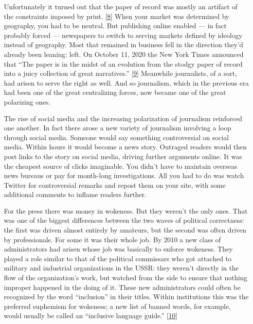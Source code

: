 Unfortunately it turned out that the paper of record was mostly an
artifact of the constraints imposed by print. {[}\hyperref[f8n]{8}{]}
When your market was determined by geography, you had to be neutral. But
publishing online enabled --- in fact probably forced --- newspapers to
switch to serving markets defined by ideology instead of geography. Most
that remained in business fell in the direction they'd already been
leaning: left. On October 11, 2020 the New York Times announced that
``The paper is in the midst of an evolution from the stodgy paper of
record into a juicy collection of great narratives.''
{[}\hyperref[f9n]{9}{]} Meanwhile journalists, of a sort, had arisen to
serve the right as well. And so journalism, which in the previous era
had been one of the great centralizing forces, now became one of the
great polarizing ones.

The rise of social media and the increasing polarization of journalism
reinforced one another. In fact there arose a new variety of journalism
involving a loop through social media. Someone would say something
controversial on social media. Within hours it would become a news
story. Outraged readers would then post links to the story on social
media, driving further arguments online. It was the cheapest source of
clicks imaginable. You didn't have to maintain overseas news bureaus or
pay for month-long investigations. All you had to do was watch Twitter
for controversial remarks and repost them on your site, with some
additional comments to inflame readers further.

For the press there was money in wokeness. But they weren't the only
ones. That was one of the biggest differences between the two waves of
political correctness: the first was driven almost entirely by amateurs,
but the second was often driven by professionals. For some it was their
whole job. By 2010 a new class of administrators had arisen whose job
was basically to enforce wokeness. They played a role similar to that of
the political commissars who got attached to military and industrial
organizations in the USSR: they weren't directly in the flow of the
organization's work, but watched from the side to ensure that nothing
improper happened in the doing of it. These new administrators could
often be recognized by the word ``inclusion'' in their titles. Within
institutions this was the preferred euphemism for wokeness; a new list
of banned words, for example, would usually be called an ``inclusive
language guide.'' {[}\hyperref[f10n]{10}{]}

